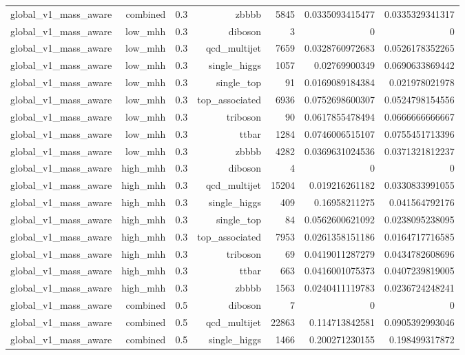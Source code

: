 \begin{table}[htbp]
{\begin{tabular}{lrrrrrr}
global\_v1\_mass\_aware & combined & 0.3 & zbbbb & 5845 & 0.0335093415477 & 0.0335329341317 \\
global\_v1\_mass\_aware & low\_mhh & 0.3 & diboson & 3 & 0 & 0 \\
global\_v1\_mass\_aware & low\_mhh & 0.3 & qcd\_multijet & 7659 & 0.0328760972683 & 0.0526178352265 \\
global\_v1\_mass\_aware & low\_mhh & 0.3 & single\_higgs & 1057 & 0.02769900349 & 0.0690633869442 \\
global\_v1\_mass\_aware & low\_mhh & 0.3 & single\_top & 91 & 0.0169089184384 & 0.021978021978 \\
global\_v1\_mass\_aware & low\_mhh & 0.3 & top\_associated & 6936 & 0.0752698600307 & 0.0524798154556 \\
global\_v1\_mass\_aware & low\_mhh & 0.3 & triboson & 90 & 0.0617855478494 & 0.0666666666667 \\
global\_v1\_mass\_aware & low\_mhh & 0.3 & ttbar & 1284 & 0.0746006515107 & 0.0755451713396 \\
global\_v1\_mass\_aware & low\_mhh & 0.3 & zbbbb & 4282 & 0.0369631024536 & 0.0371321812237 \\
global\_v1\_mass\_aware & high\_mhh & 0.3 & diboson & 4 & 0 & 0 \\
global\_v1\_mass\_aware & high\_mhh & 0.3 & qcd\_multijet & 15204 & 0.019216261182 & 0.0330833991055 \\
global\_v1\_mass\_aware & high\_mhh & 0.3 & single\_higgs & 409 & 0.16958211275 & 0.041564792176 \\
global\_v1\_mass\_aware & high\_mhh & 0.3 & single\_top & 84 & 0.0562600621092 & 0.0238095238095 \\
global\_v1\_mass\_aware & high\_mhh & 0.3 & top\_associated & 7953 & 0.0261358151186 & 0.0164717716585 \\
global\_v1\_mass\_aware & high\_mhh & 0.3 & triboson & 69 & 0.0419011287279 & 0.0434782608696 \\
global\_v1\_mass\_aware & high\_mhh & 0.3 & ttbar & 663 & 0.0416001075373 & 0.0407239819005 \\
global\_v1\_mass\_aware & high\_mhh & 0.3 & zbbbb & 1563 & 0.0240411119783 & 0.0236724248241 \\
global\_v1\_mass\_aware & combined & 0.5 & diboson & 7 & 0 & 0 \\
global\_v1\_mass\_aware & combined & 0.5 & qcd\_multijet & 22863 & 0.114713842581 & 0.0905392993046 \\
global\_v1\_mass\_aware & combined & 0.5 & single\_higgs & 1466 & 0.200271230155 & 0.198499317872 \\

\end{tabular}}
\end{table}
